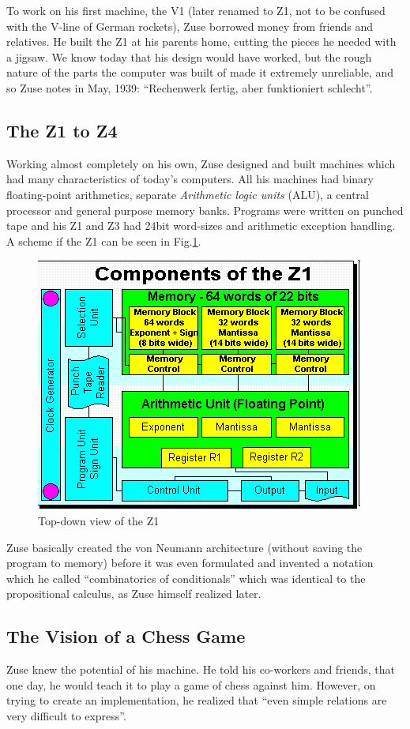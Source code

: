 \documentclass{llncs}
\begin{document}
   To work on his first machine, the V1 (later renamed to Z1, not to be 
   confused with the V-line of German rockets), Zuse borrowed money
   from friends and relatives. He built the Z1 at his parents home, cutting the 
   pieces he needed with a jigsaw. We know today that his design would have worked,
   but the rough nature of the parts the computer was built of made it extremely unreliable,
   and so Zuse notes in May, 1939: ``Rechenwerk fertig, aber funktioniert schlecht''\cite{rojas2002plankalkuel}.
 \subsection{The Z1 to Z4}
   Working almost completely on his own, Zuse designed and built machines 
   which had many characteristics of today's computers. All his machines
   had binary floating-point arithmetics, separate \emph{Arithmetic logic units} (ALU), 
   a central processor and general purpose memory banks.
   Programs were written on punched tape and his Z1 and Z3 had 24bit word-sizes
   and arithmetic exception handling. A scheme if the Z1 can be seen in Fig.\ref{fig:z1}.
   
  \begin{figure}[t]
    \centering
    \includegraphics[width=0.5\linewidth]{img/z1.png}
    \caption{Top-down view of the Z1\cite{epegmagHorstzuse}}
    \label{fig:z1}
  \end{figure}

   Zuse basically created the von Neumann architecture (without saving the program to memory)
   before it was even formulated\cite{epegmagHorstzuse} 
   and invented a notation which he called ``combinatorics of conditionals'' which was
   identical to the propositional calculus, as Zuse himself realized later.
 \subsection{The Vision of a Chess Game}
   Zuse knew the potential of his machine. He told his co-workers and 
   friends, that one day, he would teach it to play a game of chess 
   against him. However, on trying to create an implementation, he realized 
   that ``even simple relations are very difficult to express''.
   
\end{document}
